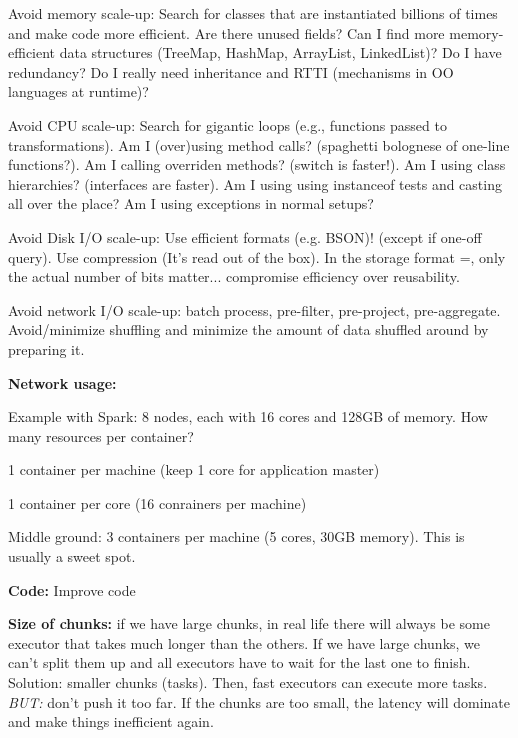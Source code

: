 \documentclass[11pt,oneside,a4paper]{article}
\begin{document}
{\begin{compactitem}
\item Avoid memory scale-up: Search for classes that are instantiated billions of times and make code more efficient. Are there unused fields? Can I find more memory-efficient data structures (TreeMap, HashMap, ArrayList, LinkedList)? Do I have redundancy? Do I really need inheritance and RTTI (mechanisms in OO languages at runtime)? 
\item Avoid CPU scale-up: Search for gigantic loops (e.g., functions passed to transformations). Am I (over)using method calls? (spaghetti bolognese of one-line functions?). Am I calling overriden methods? (switch is faster!). Am I using class hierarchies? (interfaces are faster). Am I using using instanceof tests and casting all over the place? Am I using exceptions in normal setups?
\item Avoid Disk I/O scale-up: Use efficient formats (e.g. BSON)! (except if one-off query). Use compression (It's read out of the box). In the storage format =, only the actual number of bits matter... compromise efficiency over reusability.
\item Avoid network I/O scale-up: batch process, pre-filter, pre-project, pre-aggregate. Avoid/minimize shuffling and minimize the amount of data shuffled around by preparing it.
\end{compactitem}


\textbf{Network usage:}

Example with Spark: 8 nodes, each with 16 cores and 128GB of memory. How many resources per container?

\begin{compactenum}
\item 1 container per machine (keep 1 core for application master)
\item 1 container per core (16 conrainers per machine)
\item Middle ground: 3 containers per machine (5 cores, 30GB memory). This is usually a sweet spot.
\end{compactenum}

\textbf{Code:} Improve code

\textbf{Size of chunks:} if we have large chunks, in real life there will always be some executor that takes much longer than the others. If we have large chunks, we can't split them up and all executors have to wait for the last one to finish. Solution: smaller chunks (tasks). Then, fast executors can execute more tasks. \textit{BUT:} don't push it too far. If the chunks are too small, the latency will dominate and make things inefficient again.


}
\end{document}
